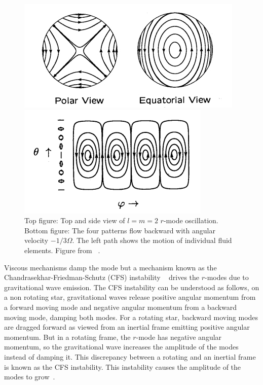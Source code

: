 \documentclass{ttuthes2007}
\begin{document}
\begin{figure}[h!]
  \centering
  \begin{minipage}[b]{0.5\textwidth}
    \includegraphics[width=\textwidth]{figure/rmodes.png}
  \end{minipage}
  \hfill
  \begin{minipage}[b]{0.5\textwidth}
    \includegraphics[width=\textwidth]{figure/rmodes1.png}
  \end{minipage}
\caption{Top figure: Top and side view of $l = m = 2$ $r$-mode oscillation.
Bottom figure: The four patterns flow backward with angular velocity
$-1/3\Omega$. The left path shows the motion of individual fluid elements.
Figure from ~\cite{lindblom2001neutron}.}
\end{figure}
 Viscous mechanisms damp the mode but a mechanism known as the
Chandrasekhar-Friedman-Schutz (CFS) instability
~\cite{PhysRevLett.24.611}\cite{1978ApJ...222..281F} drives the $r$-modes due to
gravitational wave emission. The CFS instability can be understood as follows,
on a non rotating star, gravitational waves release positive angular momentum
from a forward moving mode and negative angular momentum from a backward moving
mode, damping both modes. For a rotating star, backward moving modes are dragged
forward as viewed from an inertial frame emitting positive angular momentum. But
in a rotating frame, the $r$-mode has negative angular momentum, so the
gravitational wave increases the amplitude of the modes instead of damping it.
This discrepancy between a rotating and an inertial frame is known as the CFS
instability. This instability causes the amplitude of the modes to
grow~\cite{Owen_2000}. 
\end{document}
